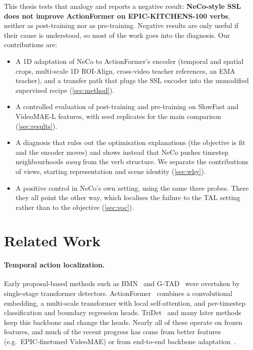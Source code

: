 \documentclass[10pt,a4paper]{article}
\begin{document}
This thesis tests that analogy and reports a negative result: \textbf{NeCo-style SSL does
not improve ActionFormer on EPIC-KITCHENS-100 verbs}, neither as post-training nor as
pre-training. Negative results are only useful if their cause is understood, so most of
the work goes into the diagnosis. Our contributions are:
\begin{itemize}\setlength\itemsep{0pt}
\item A 1D adaptation of NeCo to ActionFormer's encoder (temporal and spatial crops,
  multi-scale 1D ROI-Align, cross-video teacher references, an EMA teacher), and a
  transfer path that plugs the SSL encoder into the unmodified supervised recipe
  (\cref{sec:method}).
\item A controlled evaluation of post-training and pre-training on SlowFast and
  VideoMAE-L features, with seed replicates for the main comparison (\cref{sec:results}).
\item A diagnosis that rules out the optimisation explanations (the objective is fit and
  the encoder moves) and shows instead that NeCo pushes timestep neighbourhoods
  \emph{away} from the verb structure. We separate the contributions of views, starting
  representation and scene identity (\cref{sec:why}).
\item A positive control in NeCo's own setting, using the same three probes. There they
  all point the other way, which localises the failure to the TAL setting rather than to
  the objective (\cref{sec:voc}).
\end{itemize}

\section{Related Work}

\paragraph{Temporal action localization.}
Early proposal-based methods such as BMN~\cite{lin2019bmn} and
G-TAD~\cite{xu2020gtad} were overtaken by single-stage transformer detectors.
ActionFormer~\cite{zhang2022actionformer} combines a convolutional embedding, a
multi-scale transformer with local self-attention, and per-timestep classification and
boundary regression heads. TriDet~\cite{shi2023tridet} and many later methods keep this
backbone and change the heads. Nearly all of these operate on frozen features, and much
of the recent progress has come from better features (e.g.\ EPIC-finetuned VideoMAE) or
from end-to-end backbone adaptation~\cite{liu2024adatad,liu2025opentad}.
\end{document}
